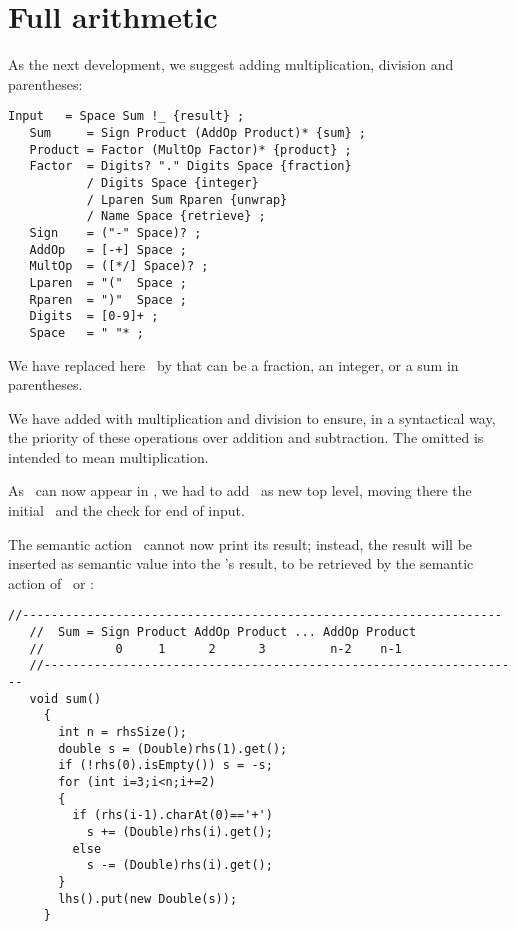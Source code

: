 
\section{Full arithmetic\label{arith}}


As the next development, we suggest adding multiplication, division
and parentheses:

\small
\begin{Verbatim}[frame=single,framesep=2mm,samepage=true,xleftmargin=15mm,xrightmargin=15mm,baselinestretch=0.8]
   Input   = Space Sum !_ {result} ;
   Sum     = Sign Product (AddOp Product)* {sum} ;
   Product = Factor (MultOp Factor)* {product} ;
   Factor  = Digits? "." Digits Space {fraction}
           / Digits Space {integer}
           / Lparen Sum Rparen {unwrap} 
           / Name Space {retrieve} ; 
   Sign    = ("-" Space)? ;
   AddOp   = [-+] Space ;
   MultOp  = ([*/] Space)? ;
   Lparen  = "("  Space ;
   Rparen  = ")"  Space ;
   Digits  = [0-9]+ ;
   Space   = " "* ;
\end{Verbatim}
\normalsize

We have replaced here \Number\ by  that can be 
a fraction, an integer, or a sum in parentheses.

We have added  with multiplication and division
to ensure, in a syntactical way, the priority of these operations
over addition and subtraction.
The omitted  is intended to mean multiplication.

As \Sum\ can now appear in ,
we had to add \Input\ as new top level, 
moving there the initial \Space\ and the check for end of input.

The semantic action \Suma\ cannot now print its result;
instead, the result will be inserted as semantic value 
into the \Sum's result,
to be retrieved by the semantic action of \Input\ or \Factor:

\small
\begin{Verbatim}[frame=single,framesep=2mm,samepage=true,xleftmargin=15mm,xrightmargin=15mm,baselinestretch=0.8]
   //-------------------------------------------------------------------
   //  Sum = Sign Product AddOp Product ... AddOp Product
   //          0     1      2      3         n-2    n-1
   //-------------------------------------------------------------------
   void sum()
     {
       int n = rhsSize();
       double s = (Double)rhs(1).get();
       if (!rhs(0).isEmpty()) s = -s;
       for (int i=3;i<n;i+=2)
       {
         if (rhs(i-1).charAt(0)=='+')
           s += (Double)rhs(i).get();
         else
           s -= (Double)rhs(i).get();
       }
       lhs().put(new Double(s));
     }
\end{Verbatim}
\normalsize

